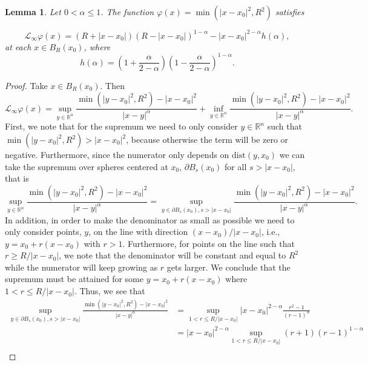 \documentclass[11pt]{article}
\newcommand{\dist}{\mathrm{dist}}
\providecommand{\Linf}{\mathcal{L}_{\infty}}
\providecommand{\Rn}{\mathbb{R}^n}
\newtheorem{lem}[thm]{Lemma}
\numberwithin{equation}{section}
\theoremstyle{definition}
\begin{document}
\begin{lem}\label{lem:mincone}
    Let $0<\alpha \leq 1$. The function $\varphi(x) = \min(|x-x_0|^2, R^2)$ satisfies

    \begin{equation}\label{eq:Linfsub}
        \Linf \varphi(x)=   \left(R+|x-x_0| \right) \left(R-|x-x_0| \right)^{1-\alpha} - |x-x_0|^{2-\alpha} h(\alpha),
    \end{equation}
     at each $x \in B_R(x_0)$, where 
     $$
     h(\alpha) = \left(1+\frac{\alpha}{2-\alpha} \right)\left(1-\frac{\alpha}{2-\alpha} \right)^{1-\alpha}.
     $$
\end{lem}
\begin{proof}
    Take $x \in B_R(x_0)$. Then 
    \begin{equation*}
        \Linf \varphi(x)= \sup_{y \in \Rn} \frac{\min(|y-x_0|^2, R^2)-|x-x_0|^2}{|x-y|^{\alpha}} + \inf_{y \in \Rn} \frac{\min(|y-x_0|^2, R^2)-|x-x_0|^2}{|x-y|^{\alpha}}.
    \end{equation*}
    First, we note that for the supremum we need to only consider $y \in \Rn$ such that $\min(|y-x_0|^2, R^2) > |x-x_0|^2$,  because otherwise the term will be zero or negative. Furthermore, since the numerator only depends on $\dist(y,x_0)$ we can take the supremum over spheres centered at $x_0$, $\partial B_s(x_0)$ for all $s > |x-x_0|$, that is
    \begin{equation*}
          \sup_{y \in \Rn} \frac{\min(|y-x_0|^2, R^2)-|x-x_0|^2}{|x-y|^{\alpha}}= \sup_{y \in \partial B_s(x_0), s> |x-x_0|} \frac{\min(|y-x_0|^2, R^2)-|x-x_0|^2}{|x-y|^{\alpha}}.
    \end{equation*}
    In addition, in order to make the denominator as small as possible we need to only consider points, $y$, on the line with direction $(x-x_0)/|x-x_0|$, i.e., $y=x_0+r(x-x_0)$ with $r>1$. Furthermore, for points on the line such that $r \geq  R/|x-x_0|$, we note that the denominator will be constant and equal to $R^2$ while the numerator will keep growing as $r$ gets larger. We conclude that the supremum must be attained for some $y=x_0+r(x-x_0)$ where $1<r\leq R/|x-x_0|$. Thus, we see that
     \begin{align*}
      \sup_{y \in \partial B_s(x_0), s> |x-x_0|} \frac{\min(|y-x_0|^2, R^2)-|x-x_0|^2}{|x-y|^{\alpha}} &= \sup_{1 < r \leq R/|x-x_0|} |x-x_0|^{2-\alpha} \frac{r^2-1}{(r-1)^{\alpha}}\\
          &= |x-x_0|^{2-\alpha}  \sup_{1 < r \leq R/|x-x_0|} (r+1)(r-1)^{1-\alpha} \\

\end{align*}
\end{proof}
\end{document}

